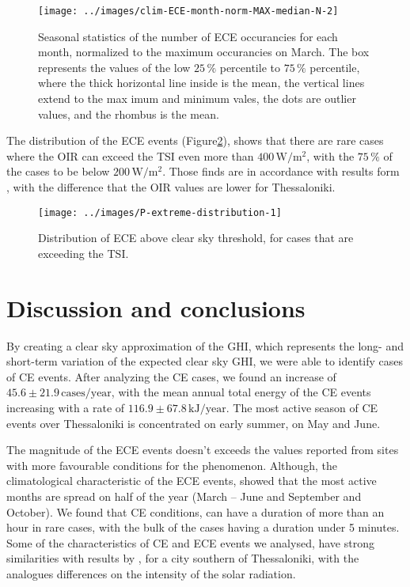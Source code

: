 \documentclass[preprint, 5p,
authoryear]{elsarticle} %
\begin{document}
\begin{figure}

{\centering \texttt{[image: ../images/clim-ECE-month-norm-MAX-median-N-2]} 

}

\caption{Seasonal statistics of the number of ECE occurancies for each month, normalized to the maximum occurancies on March. The box represents the values of the low $25\,\%$ percentile to $75\,\%$ percentile, where the thick horizontal line inside is the mean, the vertical lines extend to the max imum and minimum vales, the dots are outlier values, and the rhombus is the mean.}\label{fig:relative-month-occurancies-ECE}
\end{figure}

The distribution of the ECE events
(Figure\nobreakspace{}\ref{fig:P-extreme-distribution}), shows that
there are rare cases where the OIR can exceed the TSI even more than
\(400\,\text{W}/\text{m}^2\), with the \(75\,\%\) of the cases to be
below \(200\,\text{W}/\text{m}^2\). Those finds are in accordance with
results form \citet{Vamvakas2020}, with the difference that the OIR
values are lower for Thessaloniki.

\begin{figure}

{\centering \texttt{[image: ../images/P-extreme-distribution-1]} 

}

\caption{Distribution of ECE above clear sky threshold, for cases that are exceeding the TSI.}\label{fig:P-extreme-distribution}
\end{figure}

\hypertarget{discussion-and-conclusions}{%
\section{Discussion and conclusions}\label{discussion-and-conclusions}}

By creating a clear sky approximation of the GHI, which represents the
long- and short-term variation of the expected clear sky GHI, we were
able to identify cases of CE events. After analyzing the CE cases, we
found an increase of \(45.6\pm 21.9\,\text{cases}/\text{year}\), with
the mean annual total energy of the CE events increasing with a rate of
\(116.9\pm 67.8\,\text{kJ}/\text{year}\). The most active season of CE
events over Thessaloniki is concentrated on early summer, on May and
June.

The magnitude of the ECE events doesn't exceeds the values reported from
sites with more favourable conditions for the phenomenon. Although, the
climatological characteristic of the ECE events, showed that the most
active months are spread on half of the year (March -- June and
September and October). We found that CE conditions, can have a duration
of more than an hour in rare cases, with the bulk of the cases having a
duration under 5 minutes. Some of the characteristics of CE and ECE
events we analysed, have strong similarities with results by
\citet{Vamvakas2020}, for a city southern of Thessaloniki, with the
analogues differences on the intensity of the solar radiation.
\end{document}
